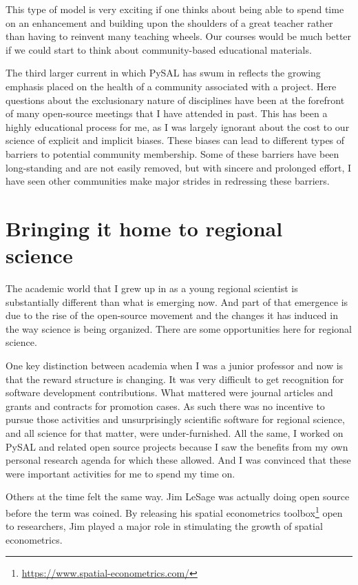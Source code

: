 \documentclass[11pt]{article}
\begin{document}
This type of model is very exciting if one thinks about being able to spend
time on an enhancement  and building upon the shoulders of a great teacher
rather than having to reinvent many teaching wheels. Our courses would be much
better if we could start to think about community-based educational
materials.


The third larger current in which PySAL has swum in reflects the growing emphasis
placed on the health of a community associated with a project. Here questions
about the exclusionary nature of disciplines have been at the forefront of many
open-source meetings that I have attended in past. This has been a highly
educational process for me, as I was largely ignorant about the cost to our
science of explicit and implicit biases. These biases can lead to different
types of barriers to potential community membership. Some of these barriers
have been long-standing and are not easily removed, but with sincere and
prolonged effort, I have seen other communities make major strides in
redressing these barriers.
\section*{Bringing it home to regional science}
\label{sec:org92caa96}
The academic world that I grew up in as a young regional scientist is
substantially different than what is emerging now. And part of that emergence
is due to the rise of the open-source movement and the changes it has induced in
the way science is being organized. There are some opportunities here for
regional science.

One key distinction between academia when I was a junior professor and now is
that the reward structure is changing. It was very difficult to get recognition
for software development contributions. What mattered were journal articles and
grants and contracts for promotion cases. As such there was no incentive to
pursue those activities and unsurprisingly scientific software for regional
science, and all science for that matter, were under-furnished. All the same, I
worked on PySAL and related open source projects because I saw the benefits
from my own personal research agenda for which these allowed. And I was
convinced that these were important activities for me to spend my time on.

Others at the time felt the same way. Jim LeSage was actually doing open
source before the term was coined. By releasing his spatial econometrics
toolbox\footnote{\url{https://www.spatial-econometrics.com/}} open to researchers, Jim played a major role in stimulating the growth
of spatial econometrics.
\end{document}
